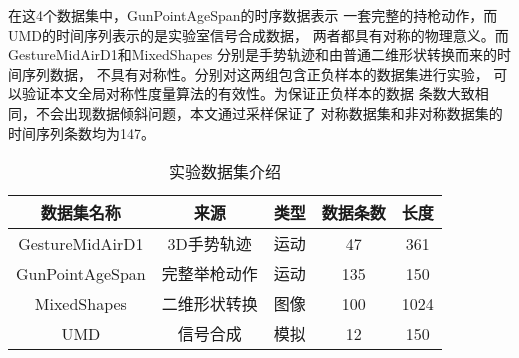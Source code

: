 在这4个数据集中，GunPointAgeSpan的时序数据表示
一套完整的持枪动作，而UMD的时间序列表示的是实验室信号合成数据，
两者都具有对称的物理意义。而GestureMidAirD1和MixedShapes
分别是手势轨迹和由普通二维形状转换而来的时间序列数据，
不具有对称性。分别对这两组包含正负样本的数据集进行实验，
可以验证本文全局对称性度量算法的有效性。为保证正负样本的数据
条数大致相同，不会出现数据倾斜问题，本文通过采样保证了
对称数据集和非对称数据集的时间序列条数均为147。

\begin{table}
  \centering
  \caption{实验数据集介绍}
  \begin{tabular}{ccccc}
    \toprule
    数据集名称      & 来源         & 类型 & 数据条数 & 长度 \\
    \midrule
    GestureMidAirD1 & 3D手势轨迹   & 运动 & 47       & 361  \\
    GunPointAgeSpan & 完整举枪动作 & 运动 & 135      & 150  \\
    MixedShapes     & 二维形状转换 & 图像 & 100      & 1024 \\
    UMD             & 信号合成     & 模拟 & 12       & 150  \\
    \bottomrule
  \end{tabular}
  \label{tab:experiment_dataset}
\end{table}

